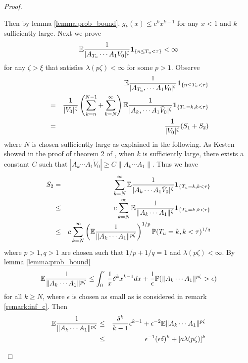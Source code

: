 \documentclass{article}
\theoremstyle{remark}
\begin{document}
\begin{proof}
\begin{enumerate}
\[    \]
    Then by lemma \ref{lemma:prob_bound}, $g_k(x) \leq c^k x^{k-1}$
    for any $x < 1$ and $k$ sufficiently large. Next we prove
    \[
    \mathbb{E} {1 \over |A_{T_u} \cdots A_1 V_0|^\zeta}\mathbf{1}_{\{n \leq T_u < \tau\}} < \infty
    \]
    for any $\zeta > \xi$ that satisfies $\lambda(p\zeta) < \infty$ for some
    $p > 1$. Observe
    \begin{eqnarray*}
      && \mathbb{E} {1 \over |A_{T_u}, \cdots A_1 V_0|^\zeta} \mathbf{1}_{\{n \leq T_u < \tau\}}\\
      &=& {1 \over |V_0|^{\zeta}} \left(
        \sum_{k=n}^{N-1} + \sum_{k=N}^\infty
      \right) \mathbb{E} {1 \over |A_k, \cdots A_1 \tilde V_0|^{\zeta}}
      \mathbf{1}_{\{T_u = k, k < \tau\}} \\
      &=& {1 \over |V_0|^{\zeta}}(S_1 + S_2)
      \end{eqnarray*}
      where $N$ is chosen sufficiently large as explained in the following. As
      Kesten showed in the proof of theorem 2 of \cite{Kesten1973},
      when $k$ is sufficiently large, there exists a constant $C$ such
      that $|A_k \cdots A_1 \tilde V_0| \geq C \|A_k \cdots A_1\|$. Thus we have
      \begin{eqnarray*}
        S_2 &=& \sum_{k=N}^{\infty}
        \mathbb{E} {1 \over |A_k \cdots A_1  \tilde V_0|^\zeta}
        \mathbf{1}_{\{T_u = k, k < \tau\}} \\
        &\leq& c \sum_{k=N}^{\infty}
        \mathbb{E} {1 \over \|A_k \cdots A_1\|^\zeta} \mathbf{1}_{\{T_u = k, k < \tau\}} \\
        &\leq& c \sum_{k=N}^{\infty}
        \left(
          \mathbb{E} {1 \over \|A_k \cdots A_1\|^{p \zeta}}
          \right)^{1/p}
          \mathbb{P}(T_u = k, k < \tau)^{1/q} \\
      \end{eqnarray*}
      where $p > 1, q > 1$ are chosen such that $1/p + 1/q = 1$ and
      $\lambda(p\zeta) < \infty$. By lemma \ref{lemma:prob_bound}
      \[
      \mathbb{E} {1 \over \|A_k \cdots A_1\|^{p \zeta}} \leq 
      \int_0^\epsilon {1 \over x} \delta^k x^{k-1} dx
      +
      {1 \over \epsilon} \mathbb{P}(\|A_k \cdots A_1\|^{p \zeta} > \epsilon)
      \]
      for all $k \geq N$, where $\epsilon$ is chosen as small as is considered in remark
      \ref{remark:inf_c}. Then
        \begin{eqnarray*}
          \mathbb{E} {1 \over \|A_k \cdots A_1\|^{p \zeta}} &\leq& {\delta^k
            \over k-1} \epsilon^{k-1} + \epsilon^{-2} \mathbb{E} \|A_k \cdots
          A_1\|^{p \zeta} \\
          &\leq& \epsilon^{-1} (\epsilon \delta)^k + [a \lambda(p\zeta)]^k
        \end{eqnarray*}

\end{enumerate}
\end{proof}
\end{document}
